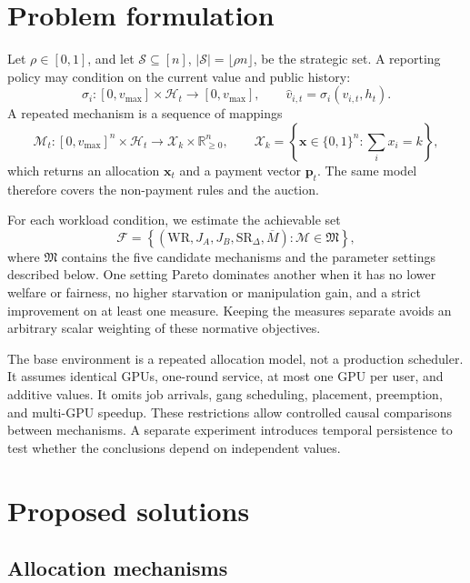 \documentclass{article}
\begin{document}
\section{Problem formulation}
\label{sec:formulation}

Let $\rho\in[0,1]$, and let
$\mathcal S\subseteq[n]$, $|\mathcal S|=\lfloor\rho n\rfloor$, be the
strategic set. A reporting policy may condition on the current value and
public history:
\[
  \sigma_i:[0,v_{\max}]\times\mathcal H_t
  \longrightarrow[0,v_{\max}],
  \qquad
  \hat v_{i,t}=\sigma_i(v_{i,t},h_t).
\]
A repeated mechanism is a sequence of mappings
\[
  \mathcal M_t:
  [0,v_{\max}]^n\times\mathcal H_t
  \longrightarrow
  \mathcal X_k\times\mathbb R_{\ge0}^n,
  \qquad
  \mathcal X_k=
  \left\{\mathbf x\in\{0,1\}^n:\sum_i x_i=k\right\},
\]
which returns an allocation $\mathbf x_t$ and a payment vector $\mathbf p_t$.
The same model therefore covers the non-payment rules and the auction.

For each workload condition, we estimate the achievable set
\[
  \mathcal F=
  \left\{
  (\mathrm{WR},J_A,J_B,\mathrm{SR}_{\Delta},\overline M):
  \mathcal M\in\mathfrak M
  \right\},
\]
where $\mathfrak M$ contains the five candidate mechanisms and the parameter
settings described below. One setting Pareto dominates another when it has no
lower welfare or fairness, no higher starvation or manipulation gain, and a
strict improvement on at least one measure. Keeping the measures separate
avoids an arbitrary scalar weighting of these normative objectives.

The base environment is a repeated allocation model, not a production
scheduler. It assumes identical GPUs, one-round service, at most one GPU per
user, and additive values. It omits job arrivals, gang scheduling, placement,
preemption, and multi-GPU speedup. These restrictions allow controlled causal
comparisons between mechanisms. A separate experiment introduces temporal
persistence to test whether the conclusions depend on independent values.

\section{Proposed solutions}
\label{sec:solutions}

\subsection{Allocation mechanisms}
\end{document}
